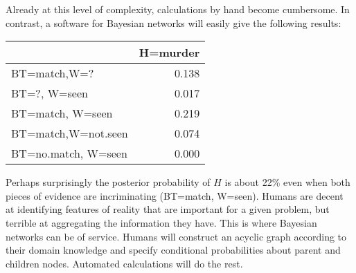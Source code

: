 \documentclass{article}
\begin{document}
\noindent Already at this level of complexity, calculations by hand become cumbersome. In contrast, a software for Bayesian networks \citep[see, for example, the $\textbf{\textsf{R}}$
package  $\textbf{\textsf{bnlearn}}$ developed by Marco Scutari and described in][]{Scutari2015Bayesian-Networ}
will easily give the following results: 
%
%
\begin{table}[H]
\centering
\begin{tabular}{lr}
\toprule
  & H=murder\\
\midrule
BT=match,W=? & 0.138\\
BT=?, W=seen & 0.017\\
BT=match, W=seen & 0.219\\
BT=match,W=not.seen & 0.074\\
BT=no.match, W=seen & 0.000\\
\bottomrule
\end{tabular}
\end{table}
%
\noindent
Perhaps surprisingly the posterior probability of $H$ is about 22\% even when both pieces of evidence are incriminating (BT=match, W=seen).
%
%
Humans are decent at identifying features
of reality that are important for a given problem, but terrible at
aggregating the information they have. This is where
Bayesian networks can be of service. Humans will construct an acyclic graph according to their domain knowledge and specify conditional probabilities about parent and children nodes. Automated calculations will do the rest. 
\end{document}
